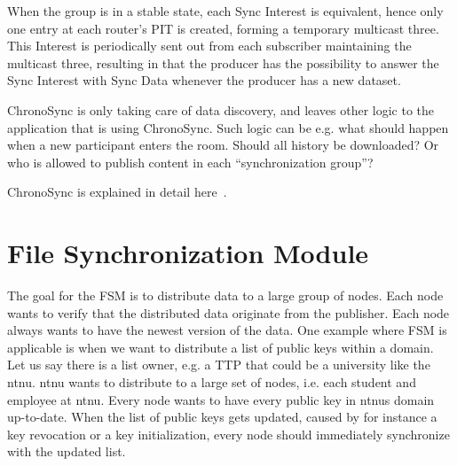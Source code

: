 When the group is in a stable state, each Sync Interest is equivalent, hence only one entry at each router's \gls{PIT} is created, forming a temporary multicast three.
This Interest is periodically sent out from each subscriber maintaining the multicast three, resulting in that the producer has the possibility to answer the Sync Interest with Sync Data whenever the producer has a new dataset.

ChronoSync is only taking care of data discovery, and leaves other logic to the application that is using ChronoSync. 
Such logic can be e.g. what should happen when a new participant enters the room.
Should all history be downloaded? 
Or who is allowed to publish content in each ``synchronization group''?


ChronoSync is explained in detail here~\cite{DBLP:conf/icnp/ZhuA13}.

\section{File Synchronization Module}\label{file-sync}
The goal for the \gls{FSM} is to distribute data to a large group of nodes.
Each node wants to verify that the distributed data originate from the publisher.
Each node always wants to have the newest version of the data. 
One example where \gls{FSM} is applicable is when we want to distribute a list of public keys within a domain.
Let us say there is a list owner, e.g. a \gls{TTP} that could be a university like the \gls{ntnu}.
\gls{ntnu} wants to distribute to a large set of nodes, i.e. each student and employee at \gls{ntnu}.
Every node wants to have every public key in \gls{ntnu}s domain up-to-date.
When the list of public keys gets updated, caused by for instance a key revocation or a key initialization, every node should immediately synchronize with the updated list.


